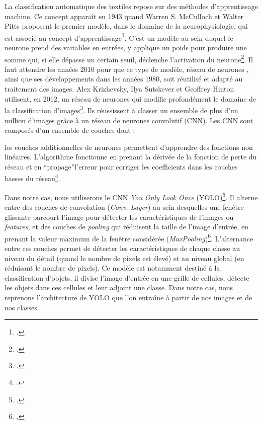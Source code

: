 La classification automatique des textiles repose sur des méthodes d'apprentissage machine. Ce concept apparaît en 1943 quand Warren S. McCulloch et Walter Pitts proposent le premier modèle, dans le domaine de la neurophysiologie, qui est associé au concept d'apprentissage\footcite{mccullochLogicalCalculusIdeas1943}. C'est un modèle au sein duquel \og le neurone prend des variables en entrées, y applique un poids pour produire une somme qui, si elle dépasse un certain seuil, déclenche l'activation du neurone\footcite{cardonRevancheNeuronesInvention2018}\fg. Il faut attendre les années 2010 pour que ce type de modèle, \og réseau de neurones \fg, ainsi que ses développements dans les années 1980, soit réutilisé et adapté au traitement des images. Alex Krizhevsky, Ilya Sutskever et Geoffrey Hinton utilisent, en 2012, un réseau de neurones qui modifie profondément le domaine de la classification d'images\footcite{hintonImprovingNeuralNetworks2012}. Ils réussissent à classer un ensemble de plus d'un million d'images grâce à un réseau de neurones convolutif (CNN). Les CNN sont composés d'un ensemble de couches dont :
\begin{citer}
 	les couches additionnelles de neurones permettent d'apprendre des fonctions non linéaires. L'algorithme fonctionne en prenant la dérivée de la fonction de perte du réseau et en \textquotedblleft propage\textquotedblright \:l'erreur pour corriger les coefficients dans les couches basses du réseau\footcite[p.~198]{cardonRevancheNeuronesInvention2018}. 
 \end{citer}
 \noindent Dans notre cas, nous utiliserons le CNN \textit{You Only Look Once} (YOLO)\footcite[p.~1]{redmonYouOnlyLook2016}. Il alterne entre des couches de convolution (\textit{Conv. Layer}) au sein desquelles une fenêtre glissante parcourt l'image pour détecter les caractéristiques de l'images ou \textit{features}, et des couches de \textit{pooling} qui réduisent la taille de l'image d'entrée, en prenant la valeur maximum de la fenêtre considérée (\textit{MaxPooling})\footcite[p.~439]{lecunDeepLearning2015}. L'alternance entre ces couches permet de détecter les caractéristiques de chaque classe au niveau du détail (quand le nombre de pixels est élevé) et au niveau global (en réduisant le nombre de pixels). Ce modèle est notamment destiné à la classification d'objets, il divise l'image d'entrée en une grille de cellules, détecte les objets dans ces cellules et leur adjoint une classe. Dans notre cas, nous reprenons l'architecture de YOLO que l'on entraîne à partir de nos images et de nos classes. 
 \clearpage
 
